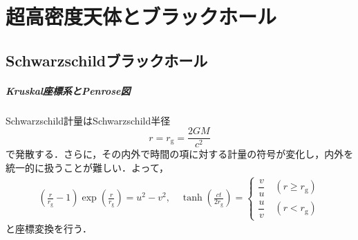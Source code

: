 \documentclass[a4paper]{ltjsreport}
\begin{document}
\chapter{超高密度天体とブラックホール}
\setcounter{section}{2}
\section{Schwarzschildブラックホール}
\paragraph{Kruskal座標系とPenrose図}
Schwarzschild計量はSchwarzschild半径
\[r=r_{\text{g}}=\frac{2GM}{c^2}\]
で発散する．さらに，その内外で時間の項に対する計量の符号が変化し，内外を統一的に扱うことが難しい．よって，
\begin{align*}
  \left(\frac{r}{r_\text{g}} - 1\right)\exp\left(\frac{r}{r_\text{g}}\right)=u^2 - v^2,\quad
  \tanh\left(\frac{ct}{2r_\text{g}}\right)=\left\{
  \begin{array}{l}
    \dfrac{v}{u}\quad(r\geq{}r_\text{g})\\
    \dfrac{u}{v}\quad(r<{}r_\text{g})
  \end{array}
  \right.
\end{align*}
と座標変換を行う．
\end{document}
